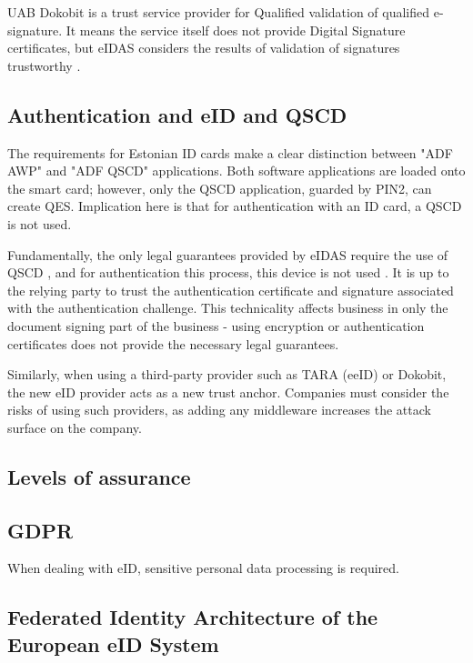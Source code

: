 UAB Dokobit is a trust service provider for Qualified validation of qualified e-signature. It means the service itself does not provide Digital Signature certificates, but eIDAS considers the results of validation of signatures trustworthy \cite{eu-trustservices}.

\subsection{Authentication and eID and QSCD}


The requirements for Estonian ID cards make a clear distinction between "ADF AWP" and "ADF QSCD" applications. Both software applications are loaded onto the smart card; however, only the QSCD application, guarded by PIN2, can create QES. Implication here is that for authentication with an ID card, a QSCD is not used.

Fundamentally, the only legal guarantees provided by eIDAS require the use of QSCD \cite{eulaw-eidas}, and for authentication this process, this device is not used \cite{ee-id-tech}. It is up to the relying party to trust the authentication certificate and signature associated with the authentication challenge. This technicality affects business in only the document signing part of the business - using encryption or authentication certificates does not provide the necessary legal guarantees.

Similarly, when using a third-party provider such as TARA (eeID) or Dokobit, the new eID provider acts as a new trust anchor. Companies must consider the risks of using such providers, as adding any middleware increases the attack surface on the company.

\subsection{Levels of assurance}


\subsection{GDPR}

When dealing with eID, sensitive personal data processing is required.

\subsection{Federated Identity Architecture of the European eID System}

